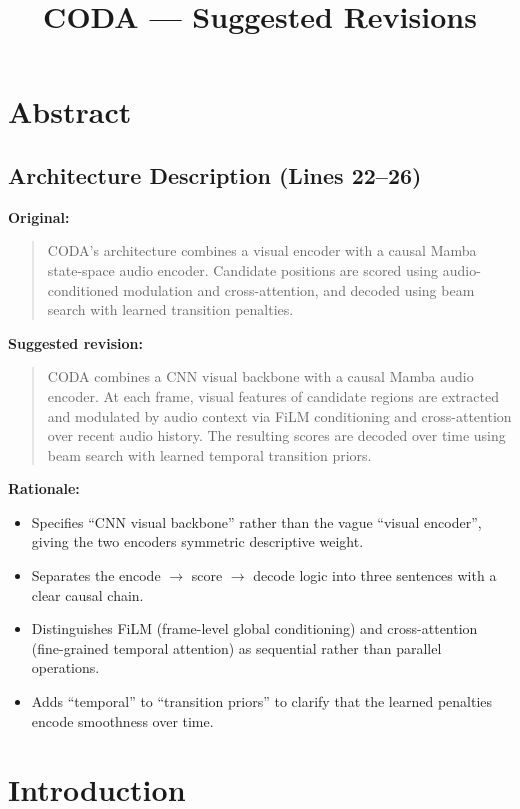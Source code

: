 \documentclass{article}
\title{CODA --- Suggested Revisions}
\date{}
\begin{document}
\maketitle

\section*{Abstract}

\subsection*{Architecture Description (Lines 22--26)}

\textbf{Original:}
\begin{quote}
CODA's architecture combines a visual encoder with a causal Mamba state-space audio encoder.
Candidate positions are scored using audio-conditioned modulation and cross-attention, and decoded
using beam search with learned transition penalties.
\end{quote}

\textbf{Suggested revision:}
\begin{quote}
CODA combines a CNN visual backbone with a causal Mamba audio encoder.
At each frame, visual features of candidate regions are extracted and modulated by audio context
via FiLM conditioning and cross-attention over recent audio history.
The resulting scores are decoded over time using beam search with learned temporal transition priors.
\end{quote}

\textbf{Rationale:}
\begin{itemize}
    \item Specifies ``CNN visual backbone'' rather than the vague ``visual encoder'', giving the two encoders symmetric descriptive weight.
    \item Separates the encode $\to$ score $\to$ decode logic into three sentences with a clear causal chain.
    \item Distinguishes FiLM (frame-level global conditioning) and cross-attention (fine-grained temporal attention) as sequential rather than parallel operations.
    \item Adds ``temporal'' to ``transition priors'' to clarify that the learned penalties encode smoothness over time.
\end{itemize}


\section*{Introduction}
\end{document}
